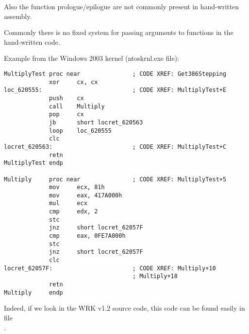 \par

Also the function prologue/epilogue are not commonly present in hand-written assembly.
\par

Commonly there is no fixed system for passing arguments to functions in the hand-written code.

\par
Example from the Windows 2003 kernel 
(ntoskrnl.exe file):

\begin{lstlisting}[style=customasm]
MultiplyTest proc near               ; CODE XREF: Get386Stepping
             xor     cx, cx
loc_620555:                          ; CODE XREF: MultiplyTest+E
             push    cx
             call    Multiply
             pop     cx
             jb      short locret_620563
             loop    loc_620555
             clc
locret_620563:                       ; CODE XREF: MultiplyTest+C
             retn
MultiplyTest endp

Multiply     proc near               ; CODE XREF: MultiplyTest+5
             mov     ecx, 81h
             mov     eax, 417A000h
             mul     ecx
             cmp     edx, 2
             stc
             jnz     short locret_62057F
             cmp     eax, 0FE7A000h
             stc
             jnz     short locret_62057F
             clc
locret_62057F:                       ; CODE XREF: Multiply+10
                                     ; Multiply+18
             retn
Multiply     endp
\end{lstlisting}

Indeed, if we look in the 
\ac{WRK} v1.2 source code, this code
can be found easily in file \\
.
